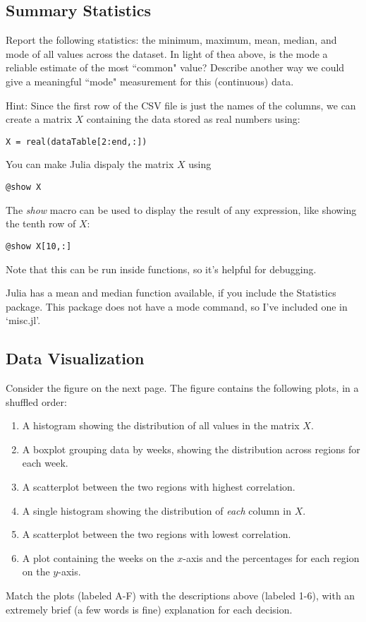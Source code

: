 \documentclass{article}
\def\blu#1{{\color{blu}#1}}
\def\enum#1{\begin{enumerate}#1\end{enumerate}}
\begin{document}
\subsection{Summary Statistics}

\blu{Report the following statistics}: the minimum, maximum, mean, median, and mode of all values across the dataset. In light of thea above, \blu{is the mode a reliable estimate of the most ``common" value? Describe another way we could give a meaningful ``mode" measurement for this (continuous) data.}

Hint: Since the first row of the CSV file is just the names of the columns, we can create a matrix $X$ containing the data stored as real numbers using:
\begin{verbatim}
X = real(dataTable[2:end,:])
\end{verbatim}
You can make Julia dispaly the matrix $X$ using
\begin{verbatim}
@show X
\end{verbatim}
The \emph{show} macro can be used to display the result of any expression, like showing the tenth row of $X$:
\begin{verbatim}
@show X[10,:]
\end{verbatim}
Note that this can be run inside functions, so it's helpful for debugging.

Julia has a mean and median function available, if you include the Statistics package. This package does not have a mode command, so I've included one in `misc.jl'.


\subsection{Data Visualization}

Consider the figure on the next page.
The figure contains the following plots, in a shuffled order:
\enum{
\item A histogram showing the distribution of all values in the matrix $X$.
\item A boxplot grouping data by weeks, showing the distribution across regions for each week.
\item A scatterplot between the two regions with highest correlation.
\item A single histogram showing the distribution of \emph{each} column in $X$.
\item A scatterplot between the two regions with lowest correlation.
\item A plot containing the weeks on the $x$-axis and the percentages for each region on the $y$-axis.
}
\blu{Match the plots (labeled A-F) with the descriptions above (labeled 1-6), with an extremely brief (a few words is fine) explanation for each decision.}
\end{document}
